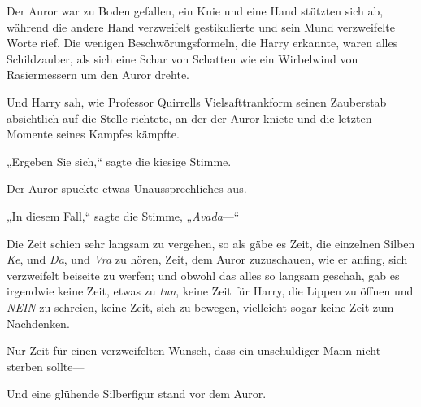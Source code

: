 Der Auror war zu Boden gefallen, ein Knie und eine Hand stützten sich ab, während die andere Hand verzweifelt gestikulierte und sein Mund verzweifelte Worte rief. Die wenigen Beschwörungsformeln, die Harry erkannte, waren alles Schildzauber, als sich eine Schar von Schatten wie ein Wirbelwind von Rasiermessern um den Auror drehte.

Und Harry sah, wie Professor Quirrells Vielsafttrankform seinen Zauberstab absichtlich auf die Stelle richtete, an der der Auror kniete und die letzten Momente seines Kampfes kämpfte.

„Ergeben Sie sich,“ sagte die kiesige Stimme.

Der Auror spuckte etwas Unaussprechliches aus.

„In diesem Fall,“ sagte die Stimme, „\emph{Avada}—“

Die Zeit schien sehr langsam zu vergehen, so als gäbe es Zeit, die einzelnen Silben \emph{Ke}, und \emph{Da}, und \emph{Vra} zu hören, Zeit, dem Auror zuzuschauen, wie er anfing, sich verzweifelt beiseite zu werfen; und obwohl das alles so langsam geschah, gab es irgendwie keine Zeit, etwas zu \emph{tun}, keine Zeit für Harry, die Lippen zu öffnen und \emph{NEIN} zu schreien, keine Zeit, sich zu bewegen, vielleicht sogar keine Zeit zum Nachdenken.

Nur Zeit für einen verzweifelten Wunsch, dass ein unschuldiger Mann nicht sterben sollte—

Und eine glühende Silberfigur stand vor dem Auror.

